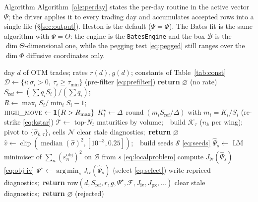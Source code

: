 \documentclass[a4paper, 11pt, reqno]{amsart}
\makeatletter
\def\section{\@startsection{section}{1}%
  \z@{.7\linespacing\@plus\linespacing}{.5\linespacing}%
  {\normalfont\bfseries\centering}}
\DeclareMathOperator*{\argmin}{arg\,min}
\DeclareMathOperator{\round}{round}
\DeclareMathOperator{\med}{median}
\DeclareMathOperator{\clip}{clip}
\makeatother
\begin{document}
	\section{Algorithm}\label{sec:algorithm}
		Algorithm~\ref{alg:perday} states the per-day routine in the active vector $\Psi$; the driver
		applies it to every trading day and accumulates accepted rows into a single file
		(\S\ref{sec:output}). Heston is the default ($\Psi=\Phi$). The Bates fit is the same algorithm with
		$\Psi=\Theta$: the engine is the \texttt{BatesEngine} and the box $\mathcal{B}$ is the
		$\dim\Theta$-dimensional one, while the pegging test \eqref{eq:pegged} still ranges over the
		$\dim\Phi$ diffusive coordinates only.
		\begin{algorithm}[H]
			\captionsetup{font=normal}
			\caption{Per-day calibration}\label{alg:perday}
			\begin{algorithmic}[1]
				\REQUIRE day $d$ of OTM trades; rates $r(d),g(d)$; constants of Table~\ref{tab:const}
				\STATE $\mathcal{D} \leftarrow \{ i : \sigma_i>0,\ \tau_i\ge\tau_{\min}\}$ \hfill (pre-filter \eqref{eq:prefilter})
				\STATE \textbf{return} $\varnothing$ \hfill (no rate)
				\ENDIF
				\STATE $S_{\mathrm{ref}} \leftarrow (\sum q_i S_i)/(\sum q_i)$; \\
				$R \leftarrow \max_i S_i / \min_i S_i - 1$; \\
				$\textsc{high\_move}\leftarrow \mathbf{1}\{R>R_{\max}\}$
				\STATE $K^\star_i \leftarrow \Delta\,\round(m_i S_{\mathrm{ref}}/\Delta)$ with $m_i=K_i/S_i$ \hfill (re-strike \eqref{eq:kstar})
				\STATE $\mathcal{T}\leftarrow$ top-$N_t$ maturities by volume;\ \ build $\mathcal{K}_\tau$ ($n_k$ per wing); \\ pivot to $\{\hat\sigma_{k,\tau}\}$, cells $\mathcal{N}$
				\STATE clear stale diagnostics;\ \textbf{return} $\varnothing$
				\ENDIF
				\STATE $\hat v \leftarrow \clip(\med(\hat\sigma)^2,[10^{-3},0.25])$;\ \ build seeds $\mathcal{S}$ \eqref{eq:seeds}
				\STATE $\widehat\Psi_s \leftarrow$ LM minimiser of $\sum_n(\varepsilon^{\mathrm{obj}}_n)^2$ on $\mathcal{B}$ from $s$ \hfill \eqref{eq:localproblem}
				\STATE compute $J_{\mathrm{iv}}(\widehat\Psi_s)$ \hfill \eqref{eq:obj-iv}
				\ENDFOR
				\STATE $\Psi^\star \leftarrow \argmin_{s} J_{\mathrm{iv}}(\widehat\Psi_s)$ \hfill (select \eqref{eq:select})
				\STATE write repriced diagnostics;\ \textbf{return} row$(d,S_{\mathrm{ref}},r,g,\Psi^\star,\mathcal{F},J_{\mathrm{iv}},J_{\mathrm{px}},\dots)$
				\ELSE
				\STATE clear stale diagnostics;\ \textbf{return} $\varnothing$ \hfill (rejected)
				\ENDIF
			\end{algorithmic}
		\end{algorithm}
	
\end{document}
